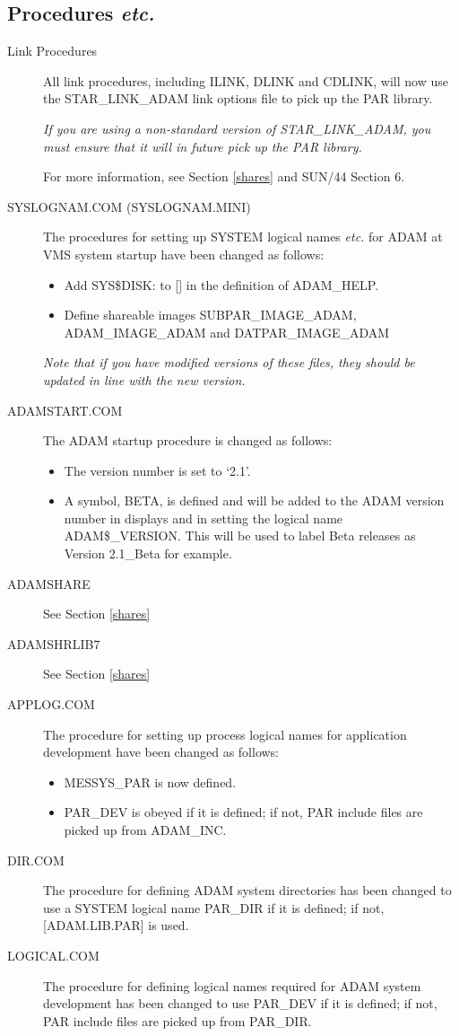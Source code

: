 \subsection{Procedures {\em etc.}}
\label{procs}
\begin{description}
\item[Link Procedures] All link procedures, including ILINK, DLINK and CDLINK,
will now use the STAR\_LINK\_ADAM link options file to pick up the PAR library.

{\em If you are using a non-standard version of STAR\_LINK\_ADAM, you must 
ensure that it will in future pick up the PAR library.}

For more information, see Section \ref{shares} and SUN/44 Section 6.
\item[SYSLOGNAM.COM (SYSLOGNAM.MINI)] The procedures for setting up SYSTEM
logical names {\em etc.} for ADAM at VMS system startup have been changed as
follows:
\begin{itemize}
\item Add SYS\$DISK: to [] in the definition of ADAM\_HELP.
\item Define shareable images SUBPAR\_IMAGE\_ADAM, ADAM\_IMAGE\_ADAM and
DATPAR\_IMAGE\_ADAM
\end{itemize}
{\em Note that if you have modified versions of these files, they should be
updated in line with the new version.}
\item[ADAMSTART.COM] The ADAM startup procedure is changed as follows:
\begin{itemize}
\item The version number is set to `2.1'.
\item A symbol, BETA, is defined and will be added to the ADAM version number 
in displays and in setting the logical name ADAM\$\_VERSION.
This will be used to label Beta releases as Version 2.1\_Beta for example.
\end{itemize}

\item[ADAMSHARE] See Section \ref{shares}
\item[ADAMSHRLIB7] See Section \ref{shares}
\item[APPLOG.COM]
The procedure  for setting up process logical names for application 
development have been changed as follows:
\begin{itemize}
\item MESSYS\_PAR is now defined. 
\item PAR\_DEV is obeyed if it is defined; if not, PAR include files are
picked up from ADAM\_INC.
\end{itemize}
\item[DIR.COM] The procedure for defining ADAM system directories has been 
changed to use a SYSTEM logical name PAR\_DIR if it is defined; if not,
[ADAM.LIB.PAR] is used.
\item[LOGICAL.COM] The procedure for defining logical names required for
ADAM system development has been changed to use PAR\_DEV if it is defined;
if not, PAR include files are picked up from PAR\_DIR.
\end{description}


